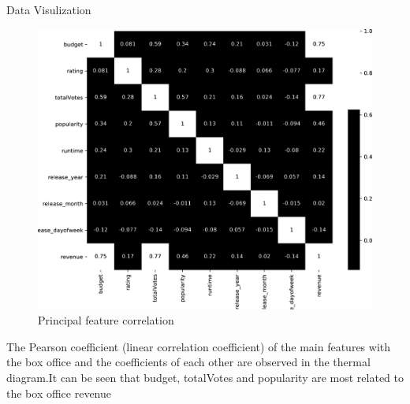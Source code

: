 \documentclass[
 size=12pt,
 paper=smartboard, %
 mode=present, %
 display=slides, %
style=tuliplab,
pauseslide,
fleqn,leqno]{powerdot}
\begin{document}
\begin{slide}{ Data Visulization}
	
	\begin{figure}[ht]%
		\centering%
		\includegraphics[scale=0.08]{logos/7.eps}
		\caption{Principal feature correlation}%
	\end{figure}
	
	\vspace{0.5cm}The Pearson coefficient (linear correlation coefficient) of the main features with the box office and the coefficients of each other are observed in the thermal diagram.It can be seen that budget, totalVotes and popularity are most related to the box office revenue
	\vspace{1cm}

	
\end{slide}

\end{document}
